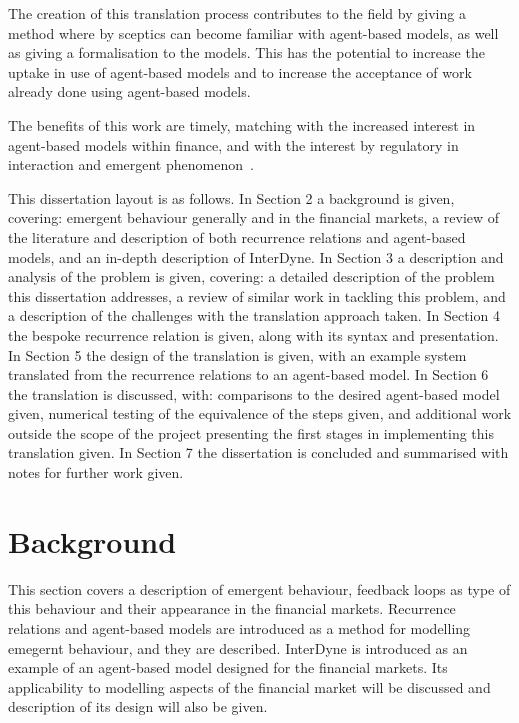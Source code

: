 \documentclass{article}
\begin{document}
The creation of this translation process contributes to the field by giving a method where by sceptics can become familiar with agent-based models, as well as giving a formalisation to the models. This has the potential to increase the uptake in use of agent-based models and to increase the acceptance of work already done using agent-based models. 

The benefits of this work are timely, matching with the increased interest in agent-based models within finance, and with the interest by regulatory in interaction and emergent phenomenon~\cite{fallacyofcompostionBook, newwork1, newabmpaper}.  

This dissertation layout is as follows. In Section 2 a background is given, covering: emergent behaviour generally and in the financial markets, a review of the literature and description of both recurrence relations and agent-based models, and an in-depth description of InterDyne. In Section 3 a description and analysis of the problem is given, covering: a detailed description of the problem this dissertation addresses, a review of similar work in tackling this problem, and a description of the challenges with the translation approach taken. In Section 4 the bespoke recurrence relation is given, along with its syntax and presentation. In Section 5 the design of the translation is given, with an example system translated from the recurrence relations to an agent-based model. In Section 6 the translation is discussed, with: comparisons to the desired agent-based model given, numerical testing of the equivalence of the steps given, and additional work outside the scope of the project presenting the first stages in implementing this translation given. In Section 7 the dissertation is concluded and summarised with notes for further work given.     








\section{Background}
This section covers a description of emergent behaviour, feedback loops as type of this behaviour and their appearance in the financial markets. Recurrence relations and agent-based models are introduced as a method for modelling emegernt behaviour, and they are described. InterDyne is introduced as an example of an agent-based model designed for the financial markets. Its applicability to modelling aspects of the financial market will be discussed and description of its design will also be given.   
\end{document}
